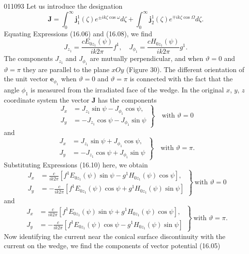 \begin{scanpage}{0110}{93}
Let us introduce the designation
\[\mathbf J=\int_0^\infty\mathbf j_1^1(\zeta)e^{\pm ik\zeta\cos\omega}d\zeta+\int_0^\infty\mathbf j_2^1(\zeta)e^{\mp ik\zeta\cos\Omega}d\zeta.\tag{16.09}\]
Equating Expressions (16.06) and (16.08), we find
\[J_{z_1}=\frac{cE_{0z_1}(\psi)}{ik2\pi}f^1,\quad J_{\phi_1}=\frac{cH_{0z_1}(\psi)}{ik2\pi}g^1.\tag{16.10}\]
The components $J_{z_1}$ and $J_{\phi_1}$ are mutually perpendicular, and when $\vartheta=0$ and $\vartheta=\pi$ they are parallel to the plane $xOy$ (Figure 30). The different orientation of the unit vector $\mathbf e_{\phi_1}$ when $\vartheta=0$ and $\vartheta=\pi$ is connected with the fact that the angle $\phi_1$ is measured from the irradiated face of the wedge. In the original $x$, $y$, $z$ coordinate system the vector $\mathbf J$ has the components
\[\left.\begin{aligned}J_x&=J_{z_1}\sin\psi-J_{\phi_1}\cos\psi,\\J_y&=-J_{z_1}\cos\psi-J_{\phi_1}\sin\psi\end{aligned}\right\}\quad\text{with }\vartheta=0\tag{16.11}\]
and
\[\left.\begin{aligned}J_x&=J_{z_1}\sin\psi+J_{\phi_1}\cos\psi,\\J_y&=-J_{z_1}\cos\psi+J_{\phi_1}\sin\psi\end{aligned}\right\}\quad\text{with }\vartheta=\pi.\tag{16.12}\]
Substituting Expressions (16.10) here, we obtain
\[\left.\begin{aligned}J_x&=\frac c{ik2\pi}[f^1E_{0z_1}(\psi)\sin\psi-g^1H_{0z_1}(\psi)\cos\psi],\\J_y&=-\frac c{ik2\pi}[f^1E_{0z_1}(\psi)\cos\psi+g^1H_{0z_1}(\psi)\sin\psi]\end{aligned}\right\}\ \text{with }\vartheta=0\tag{16.13}\]
and
\[\left.\begin{aligned}J_x&=\frac c{ik2\pi}[f^1E_{0z_1}(\psi)\sin\psi+g^1H_{0z_1}(\psi)\cos\psi],\\J_y&=-\frac c{ik2\pi}[f^1E_{0z_1}(\psi)\cos\psi-g^1H_{0z_1}(\psi)\sin\psi]\end{aligned}\right\}\ \text{with }\vartheta=\pi.\tag{16.14}\]
Now identifying the current near the conical surface discontinuity with the current on the wedge, we find the components of vector potential (16.05)
\end{scanpage}
